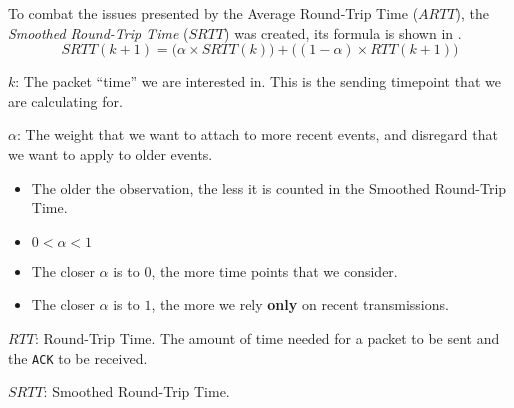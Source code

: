 To combat the issues presented by the Average Round-Trip Time ($ARTT$), the \emph{Smoothed Round-Trip Time} ($SRTT$) was created, its formula is shown in .
\begin{equation}\label{eq:Smoothed_Round_Trip_Time}
  SRTT(k+1) = \bigl( \alpha \times SRTT(k) \bigr) + \bigl( (1-\alpha) \times RTT(k+1) \bigr)
\end{equation}
\begin{description}[noitemsep]
\item $k$: The packet ``time'' we are interested in. This is the sending timepoint that we are calculating for.
\item $\alpha$: The weight that we want to attach to more recent events, and disregard that we want to apply to older events.
  \begin{itemize}[noitemsep]
  \item The older the observation, the less it is counted in the Smoothed Round-Trip Time.
  \item $0 < \alpha < 1$
  \item The closer $\alpha$ is to $0$, the more time points that we consider.
  \item The closer $\alpha$ is to $1$, the more we rely \textbf{only} on recent transmissions.
  \end{itemize}
\item $RTT$: Round-Trip Time. The amount of time needed for a packet to be sent and the \texttt{ACK} to be received.
\item $SRTT$: Smoothed Round-Trip Time.
\end{description}

